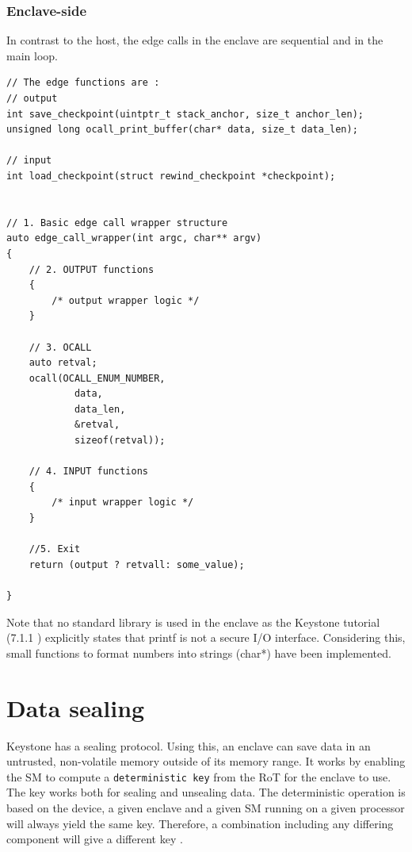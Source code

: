 \documentclass[11pt,a4paper]{report}
\begin{document}
\subsubsection{Enclave-side}
\label{subsub:edge-call-eapp}
In contrast to the host, the edge calls in the enclave are sequential and in the main loop.
\begin{verbatim}
// The edge functions are :
// output
int save_checkpoint(uintptr_t stack_anchor, size_t anchor_len);
unsigned long ocall_print_buffer(char* data, size_t data_len);

// input
int load_checkpoint(struct rewind_checkpoint *checkpoint);


// 1. Basic edge call wrapper structure
auto edge_call_wrapper(int argc, char** argv) 
{   
    // 2. OUTPUT functions
    {    
        /* output wrapper logic */
    }

    // 3. OCALL
    auto retval;
    ocall(OCALL_ENUM_NUMBER, 
            data, 
            data_len, 
            &retval, 
            sizeof(retval));

    // 4. INPUT functions
    {
        /* input wrapper logic */
    }

    //5. Exit
    return (output ? retvall: some_value);
    
}
\end{verbatim}
Note that no standard library is used in the enclave as the Keystone tutorial (7.1.1 \cite{keystone-web}) explicitly states that printf is not a secure I/O interface.
Considering this, small functions to format numbers into strings (char*) have been implemented.


\section{Data sealing}
\label{sec:data-sealing}
Keystone has a sealing protocol. 
Using this, an enclave can save data in an untrusted, non-volatile memory outside of its memory range.
It works by enabling the SM to compute a \texttt{deterministic key} from the RoT for the enclave to use.
The key works both for sealing and unsealing data.
The deterministic operation is based on the device, a given enclave and a given SM running on a given processor will always yield the same key. 
Therefore, a combination including any differing component will give a different key \cite{keystone-docs, review-keystone}.
\\
\end{document}
